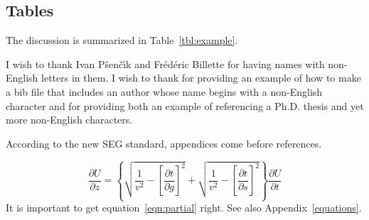 \documentclass[paper,revised]{geophysics}
\begin{document}
\subsection{Tables}

The discussion is summarized in Table~\ref{tbl:example}.


\begin{acknowledgments}
I wish to thank Ivan P\v{s}en\v{c}\'{\i}k and Fr\'ed\'eric Billette
for having names with non-English letters in them.  I wish to thank
\cite{Cerveny} for providing an example of how to make a bib file that
includes an author whose name begins with a non-English character and
\cite{forgues96} for providing both an example of referencing a Ph.D.
thesis and yet more non-English characters.
\end{acknowledgments}

\label{example}

According to the new SEG standard, appendices come before references.

\begin{equation}
\frac{\partial U}{\partial z} = 
\left\{
  \sqrt{\frac{1}{v^2} - \left[\frac{\partial t}{\partial g}\right]^2} +
  \sqrt{\frac{1}{v^2} - \left[\frac{\partial t}{\partial s}\right]^2}
\right\}
\frac{\partial U}{\partial t}
\label{eqn:partial}
\end{equation}
It is important to get equation~\ref{eqn:partial} right. See also
Appendix~\ref{equations}.
\end{document}
